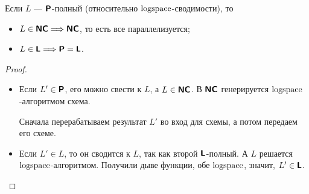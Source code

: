 \begin{thm}
	Если $ L$ --- $ \P$-полный (относительно $ \logspace$-сводимости), то
	\begin{itemize}[noitemsep]
		\item $ L \in \NC \Longrightarrow \NC$, то есть все параллелизуется;
		\item $ L \in \L \Longrightarrow  \P = \L$.
	\end{itemize}
\end{thm}
\begin{proof}
	\begin{itemize}
		\item 
			Если $ L' \in \P$, его можно свести к $ L$, а $ L \in \NC$. В $ \NC$ генерируется $ \logspace$-алгоритмом схема. 

			Сначала перерабатываем результат $ L'$ во вход для схемы, а потом передаем его схеме.

		\item Если $ L' \in L$, то он сводится к $ L$, так как второй $ \L$-полный. А $ L$ решается $ \logspace$-алгоритмом. 
			Получили дыве функции, обе $ \logspace$, значит, $ L' \in \L$.
	\end{itemize}
\end{proof}
